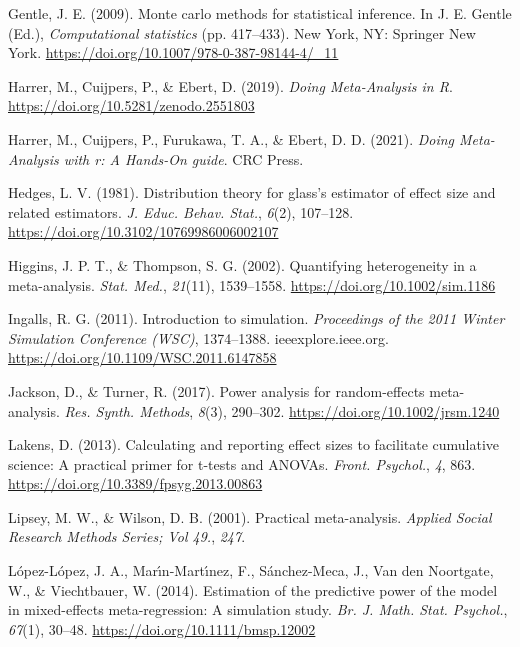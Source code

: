 \documentclass[
  man,floatsintext]{apa6}
\newlength{\cslhangindent}
\newlength{\cslentryspacingunit} %
\newenvironment{CSLReferences}[2] %
 {%
  \setlength{\parindent}{0pt}
  \ifodd #1
  \let\oldpar\par
  \def\par{\hangindent=\cslhangindent\oldpar}
  \fi
  \setlength{\parskip}{#2\cslentryspacingunit}
 }%
 {}
\begin{document}
\begin{CSLReferences}{1}{0}
\leavevmode{}%
Gentle, J. E. (2009). Monte carlo methods for statistical inference. In J. E. Gentle (Ed.), \emph{Computational statistics} (pp. 417--433). New York, NY: Springer New York. \url{https://doi.org/10.1007/978-0-387-98144-4/_11}

\leavevmode{}%
Harrer, M., Cuijpers, P., \& Ebert, D. (2019). \emph{Doing {Meta-Analysis} in {R}}. \url{https://doi.org/10.5281/zenodo.2551803}

\leavevmode{}%
Harrer, M., Cuijpers, P., Furukawa, T. A., \& Ebert, D. D. (2021). \emph{Doing {Meta-Analysis} with r: A {Hands-On} guide}. CRC Press.

\leavevmode{}%
Hedges, L. V. (1981). Distribution theory for glass's estimator of effect size and related estimators. \emph{J. Educ. Behav. Stat.}, \emph{6}(2), 107--128. \url{https://doi.org/10.3102/10769986006002107}

\leavevmode{}%
Higgins, J. P. T., \& Thompson, S. G. (2002). Quantifying heterogeneity in a meta-analysis. \emph{Stat. Med.}, \emph{21}(11), 1539--1558. \url{https://doi.org/10.1002/sim.1186}

\leavevmode{}%
Ingalls, R. G. (2011). Introduction to simulation. \emph{Proceedings of the 2011 Winter Simulation Conference ({WSC})}, 1374--1388. ieeexplore.ieee.org. \url{https://doi.org/10.1109/WSC.2011.6147858}

\leavevmode{}%
Jackson, D., \& Turner, R. (2017). Power analysis for random-effects meta-analysis. \emph{Res. Synth. Methods}, \emph{8}(3), 290--302. \url{https://doi.org/10.1002/jrsm.1240}

\leavevmode{}%
Lakens, D. (2013). Calculating and reporting effect sizes to facilitate cumulative science: A practical primer for t-tests and {ANOVAs}. \emph{Front. Psychol.}, \emph{4}, 863. \url{https://doi.org/10.3389/fpsyg.2013.00863}

\leavevmode{}%
Lipsey, M. W., \& Wilson, D. B. (2001). Practical meta-analysis. \emph{Applied Social Research Methods Series; Vol 49.}, \emph{247}.

\leavevmode{}%
López-López, J. A., Marı́n-Martı́nez, F., Sánchez-Meca, J., Van den Noortgate, W., \& Viechtbauer, W. (2014). Estimation of the predictive power of the model in mixed-effects meta-regression: A simulation study. \emph{Br. J. Math. Stat. Psychol.}, \emph{67}(1), 30--48. \url{https://doi.org/10.1111/bmsp.12002}


\end{CSLReferences}
\end{document}
